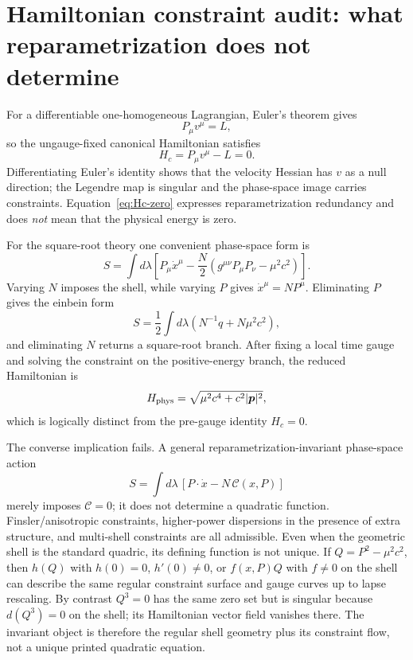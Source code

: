 \documentclass[11pt,a4paper]{article}
\begin{document}
\section{Hamiltonian constraint audit: what reparametrization does not determine}
For a differentiable one-homogeneous Lagrangian, Euler's theorem gives
\begin{equation}
P_\mu v^\mu=L,
\end{equation}
so the ungauge-fixed canonical Hamiltonian satisfies
\begin{equation}
\boxed{H_c=P_\mu v^\mu-L=0}.
\label{eq:Hc-zero}
\end{equation}
Differentiating Euler's identity shows that the velocity Hessian has $v$ as a null direction; the Legendre map is singular and the phase-space image carries constraints.  Equation~\eqref{eq:Hc-zero} expresses reparametrization redundancy and does \emph{not} mean that the physical energy is zero.

For the square-root theory one convenient phase-space form is
\begin{equation}
S=\int d\lambda\left[P_\mu\dot x^\mu-
\frac{N}{2}\left(g^{\mu\nu}P_\mu P_\nu-\mu^2c^2\right)\right].
\label{eq:phase-space-worldline}
\end{equation}
Varying $N$ imposes the shell, while varying $P$ gives $\dot x^\mu=NP^\mu$.  Eliminating $P$ gives the einbein form
\begin{equation}
S=\frac12\int d\lambda\left(N^{-1}q+N\mu^2c^2\right),
\end{equation}
and eliminating $N$ returns a square-root branch.  After fixing a local time gauge and solving the constraint on the positive-energy branch, the reduced Hamiltonian is
\begin{equation}
H_{\rm phys}=\sqrt{\mu^2c^4+c^2|\bm p|^2},
\end{equation}
which is logically distinct from the pre-gauge identity $H_c=0$.

The converse implication fails.  A general reparametrization-invariant phase-space action
\begin{equation}
S=\int d\lambda\,[P\cdot\dot x-N\,\mathcal C(x,P)]
\end{equation}
merely imposes $\mathcal C=0$; it does not determine a quadratic function.  Finsler/anisotropic constraints, higher-power dispersions in the presence of extra structure, and multi-shell constraints are all admissible.  Even when the geometric shell is the standard quadric, its defining function is not unique.  If $Q=P^2-\mu^2c^2$, then $h(Q)$ with $h(0)=0$, $h'(0)\neq0$, or $f(x,P)Q$ with $f\neq0$ on the shell can describe the same regular constraint surface and gauge curves up to lapse rescaling.  By contrast $Q^3=0$ has the same zero set but is singular because $d(Q^3)=0$ on the shell; its Hamiltonian vector field vanishes there.  The invariant object is therefore the regular shell geometry plus its constraint flow, not a unique printed quadratic equation.
\end{document}
